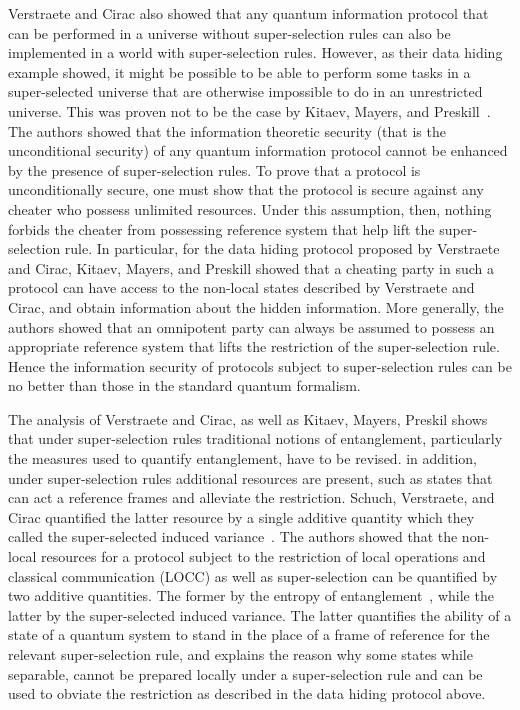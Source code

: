 \documentclass{article}
\begin{document}
Verstraete and Cirac also showed that any quantum information protocol that can be performed in a universe without super-selection rules can also be implemented in a world with super-selection rules.  However, as their data hiding example showed, it might be possible to be able to perform some tasks in a super-selected universe that are otherwise impossible to do in an unrestricted universe.  This was proven not to be the case by Kitaev, Mayers, and Preskill~\cite{KMP04}.  The authors showed that the information theoretic security (that is the unconditional security) of any quantum information protocol cannot be enhanced by the presence of super-selection rules.  To prove that a protocol is unconditionally secure, one must show that the protocol is secure against any cheater who possess unlimited resources.  Under this assumption, then, nothing forbids the cheater from possessing reference system that help lift the super-selection rule.  In particular, for the data hiding protocol proposed by Verstraete and Cirac, Kitaev, Mayers, and Preskill showed that a cheating party in such a protocol can have access to the non-local states described by Verstraete and Cirac, and obtain information about the hidden information.  More generally, the authors showed that an omnipotent party can always be assumed to possess an appropriate reference system that lifts the restriction of the super-selection rule.  Hence the information security of protocols subject to super-selection rules can be no better than those in the standard quantum formalism. 

The analysis of Verstraete and Cirac, as well as Kitaev, Mayers, Preskil shows that under super-selection rules traditional notions of entanglement, particularly the measures used to quantify entanglement, have to be revised.  in addition, under super-selection rules additional resources are present, such as states that can act a reference frames and alleviate the restriction.  Schuch, Verstraete, and Cirac quantified the latter resource by a single additive quantity which they called the super-selected induced variance~\cite{SVC04a, SVC04b}.  The authors showed that the non-local resources for a protocol subject to the restriction of local operations and classical communication (LOCC) as well as super-selection can be quantified by two additive quantities.  The former by the entropy of entanglement~\cite{BBPS96}, while the latter by the super-selected induced variance.  The latter quantifies the ability of a state of a quantum system to stand in the place of a frame of reference for the relevant super-selection rule, and explains the reason why some states while separable, cannot be prepared locally under a super-selection rule and can be used to obviate the restriction as described in the data hiding protocol above.  
\end{document}
